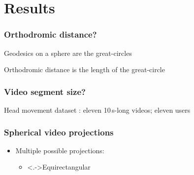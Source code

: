 \section{Results}

\begin{frame}[c]
   \frametitle{Orthodromic distance?}

   Geodesics on a sphere are the great-circles

   Orthodromic distance is the length of the great-circle

   \begin{independentCounter}
      \begin{center}
         
      \end{center}
   \end{independentCounter}

\end{frame}

\begin{frame}[c]
   \frametitle{Video segment size?}
   Head movement dataset
   : eleven 10\,s-long videos; eleven users%
   \vspace{-0.4cm}
   \begin{independentCounter}
   \end{independentCounter}
\end{frame}

\begin{frame}[c]
   \frametitle{Spherical video projections}

   \vfill

   \begin{itemize}
      \item<+-> Multiple possible projections:
      \begin{itemize}
         \item \uncover<.->{Equirectangular}
      \end{itemize}
   \end{itemize}

   \vfill

   \begin{independentCounter}
      \begin{center}
         
      \end{center}
   \end{independentCounter}

\end{frame}

